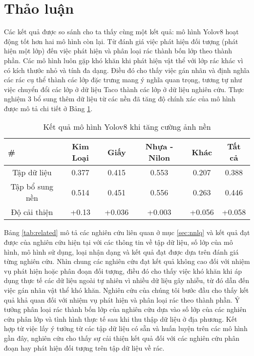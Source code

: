\documentclass[../the.tex]{subfiles}
\begin{document}
\section{Thảo luận}
 {\fontsize{13}{12} \selectfont
  Các kết quả được so sánh cho ta thấy cùng một kết quả: mô hình Yolov8 hoạt động tốt hơn hai mô hình còn lại.
  Từ đánh giá việc phát hiện đối tượng (phát hiện một lớp) đến việc phát hiện và phân loại rác thành bốn lớp theo thành phần.
  Các mô hình luôn gặp khó khăn khi phát hiện vật thể với lớp rác khác vì có kích thước nhỏ và tính đa dạng.
  Điều đó cho thấy việc gán nhãn và định nghĩa các rác cụ thể thành các lớp đặc trưng mang ý nghĩa quan trọng,
  tương tự như việc chuyển đổi các lớp ở dữ liệu Taco thành các lớp ở dữ liệu nghiên cứu.
  Thực nghiệm 3 bổ sung thêm dữ liệu từ các nền đã tăng độ chính xác của mô hình được mô tả chi tiết ở Bảng \ref{tab:thaoluan1}.
 }


 \begin{table}[h!]
    \centering
    \caption{Kết quả mô hình Yolov8 khi tăng cường ảnh nền}
    \begin{tabular}{|c|c|c|c|c|c|}
        \hline
        \multicolumn{1}{|l|}{\textbf{\#}} & \textbf{Kim Loại} & \textbf{Giấy} & \textbf{Nhựa - Nilon} & \textbf{Khác} & \textbf{Tất cả} \\ \hline
        Tập dữ liệu                       & 0.377             & 0.415         & 0.553                 & 0.207         & 0.388           \\ \hline
        Tập bổ sung   nền                 & 0.514     & 0.451 & 0.556         & 0.263  & 0.446     \\ \hline
        Độ cải thiện                & +0.13     & +0.036 & +0.003         & +0.056  & +0.058    \\ \hline
    \end{tabular}
    \label{tab:thaoluan1}
\end{table}



{\fontsize{13}{12} \selectfont
    Bảng \ref{tab:related} 
    mô tả các nghiên cứu liên quan ở mục \ref{sec:nnlq} và kết quả đạt được của nghiên cứu hiện tại với các thông tin về tập dữ liệu, số lớp của mô hình, mô hình sử dụng, loại nhận dạng và kết quả đạt được dựa trên đánh giá từng nghiên cứu.
    Nhìn chung các nghiên cứu đạt kết quả không cao đối với nhiệm vụ phát hiện hoặc phân đoạn đối tượng, điều đó cho thấy việc khó khăn khi áp dụng thực tế các dữ liệu ngoài tự nhiên vì nhiều dữ liệu gây nhiễu,
    từ đó dẫn đến việc gán nhãn vật thể khó khăn.
    Nghiên cứu của chúng tôi bước đầu cho thấy kết quả khả quan đối với nhiệm vụ phát hiện và phân loại rác theo thành phần. 
    Ý tưởng phân loại rác thành bốn lớp của nghiên cứu dựa vào số lớp của các nghiên cứu phân lớp và tình hình thực tế sau khi thu thập dữ liệu ở địa phương. Kết hợp từ việc lấy ý tưởng từ các tập dữ liệu có sẵn và huấn luyện trên các mô hình gần đây,
    nghiên cứu cho thấy sự cải thiện kết quả đối với các nghiên cứu phân đoạn hay phát hiện đối tượng trên tập dữ liệu về rác.
}
\end{document}
